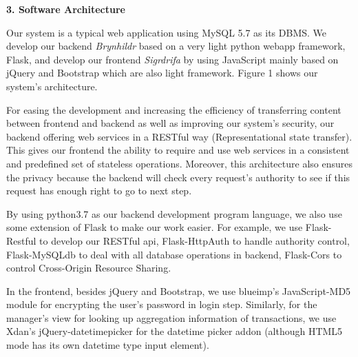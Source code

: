 \documentclass[12pt,a4paper]{report}
\begin{document}
\begin{mypara}
  \textbf{3. Software Architecture}
  \par
  Our system is a typical web application using MySQL 5.7 as its DBMS. We develop our backend \textit{Brynhildr} based on a very light python webapp framework, Flask, and develop our frontend \textit{Sigrdrifa} by using JavaScript mainly based on jQuery and Bootstrap which are also light framework. Figure 1 shows our system's architecture.
  \par
  For easing the development and increasing the efficiency of transferring content between frontend and backend as well as improving our system's security, our backend offering web services in a RESTful way (Representational state transfer). This gives our frontend the ability to require and use web services in a consistent and predefined set of stateless operations. Moreover, this architecture also ensures the privacy because the backend will check every request's authority to see if this request has enough right to go to next step.
  \par
  By using python3.7 as our backend development program language, we also use some extension of Flask to make our work easier. For example, we use Flask-Restful to develop our RESTful api, Flask-HttpAuth to handle authority control, Flask-MySQLdb to deal with all database operations in backend, Flask-Cors to control Cross-Origin Resource Sharing.
  \par
  In the frontend, besides jQuery and Bootstrap, we use blueimp's JavaScript-MD5 module for encrypting the user's password in login step. Similarly, for the manager's view for looking up aggregation information of transactions, we use Xdan's jQuery-datetimepicker for the datetime picker addon (although HTML5 mode has its own datetime type input element).
  \par\noindent\ignorespaces
  \begin{center}
\end{center}
\end{mypara}
\end{document}

